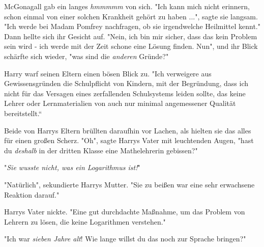 McGonagall gab ein langes \emph{hmmmmm} von sich. "Ich kann mich nicht erinnern, schon einmal von einer solchen Krankheit gehört zu haben ...", sagte sie langsam. "Ich werde bei Madam Pomfrey nachfragen, ob sie irgendwelche Heilmittel kennt." Dann hellte sich ihr Gesicht auf. "Nein, ich bin mir sicher, dass das kein Problem sein wird - ich werde mit der Zeit schone eine Lösung finden.  Nun", und ihr Blick schärfte sich wieder, "was sind die \emph{anderen} Gründe?"

Harry warf seinen Eltern einen bösen Blick zu. "Ich verweigere aus Gewissensgründen die Schulpflicht von Kindern, mit der Begründung, dass ich nicht für das Versagen eines zerfallenden Schulsystems leiden sollte, das keine Lehrer oder Lernmaterialien von auch nur minimal angemessener Qualität bereitstellt.“

Beide von Harrys Eltern brüllten daraufhin vor Lachen, als hielten sie das alles für einen großen Scherz. "Oh", sagte Harrys Vater mit leuchtenden Augen, "hast du \emph{deshalb} in der dritten Klasse eine Mathelehrerin gebissen?"

"\emph{Sie wusste nicht, was ein Logarithmus ist!}"

"Natürlich", sekundierte Harrys Mutter. "Sie zu beißen war eine sehr erwachsene Reaktion darauf."

Harrys Vater nickte. "Eine gut durchdachte Maßnahme, um das Problem von Lehrern zu lösen, die keine Logarithmen verstehen."

"Ich war \emph{sieben Jahre alt}! Wie lange willst du das noch zur Sprache bringen?"

